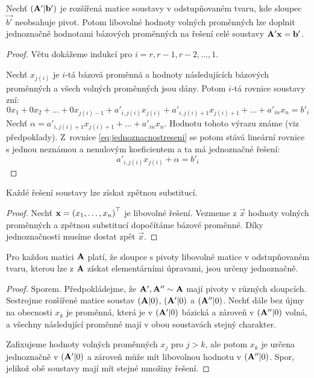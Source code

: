 \begin{theorem}
    \label{th:jednoznacnostreseni}
    Nechť $(\mathbf{A'}|\mathbf{b'})$ je rozšířená matice soustavy v odstupňovaném
    tvaru, kde sloupec $\vec{b'}$ neobsahuje pivot. Potom libovolné hodnoty
    volných proměnných lze doplnit jednoznačně hodnotami bázových proměnných
    na řešení celé soustavy $\mathbf{A'}\mathbf{x} = \mathbf{b'}$.
\end{theorem}

\begin{proof}
    Větu dokážeme indukcí pro $i=r,r-1,r-2,\dots,1$.

    Nechť $x_{j(i)}$ je $i$-tá bázová proměnná a hodnoty následujících
    bázových proměnných a všech volných proměnných jsou dány. Potom $i$-tá
    rovnice soustavy zní:
    \begin{equation}
        \label{eq:jednoznacnostreseni}
        0x_1 + 0x_2 + \dots + 0x_{j(i) -1} + a'_{i,j(i)}x_{j(i)} +
        a'_{i,j(i)+1}x_{j(i)+1} + \dots + a'_{in}x_n = b'_i
    \end{equation}
    Nechť $\alpha = a'_{i,j(i)+1}x_{j(i)+1} + \dots + a'_{in}x_n$. Hodnotu
    tohoto výrazu známe (viz předpoklady). Z~rovnice 
    \ref{eq:jednoznacnostreseni} se potom stává lineární rovnice s jednou
    neznámou a nenulovým koeficientem a ta má jednoznačné řešení:
    \begin{equation*}
        a'_{i,j(i)}x_{j(i)} + \alpha = b'_i
    \end{equation*}
\end{proof}

\begin{corollary}
    Každé řešení soustavy lze získat zpětnou substitucí.
\end{corollary}

\begin{proof}
    Nechť $\mathbf{x}=\left( x_1,\dots,x_n\right)^\top$ je libovolné řešení. Vezmeme z
    $\vec{x}$ hodnoty volných proměnných a zpětnou substitucí dopočítáme
    bázové proměnné. Díky jednoznačnosti musíme dostat zpět $\vec{x}$.
\end{proof}

\begin{theorem}
    Pro každou matici $\mathbf{A}$ platí, že sloupce s pivoty libovolné
    matice v odstupňovaném tvaru, kterou lze z $\mathbf{A}$ získat
    elementárními úpravami, jsou určeny jednoznačně.
\end{theorem}

\begin{proof}
    Sporem. Předpokládejme, že $\mathbf{A'},\mathbf{A''} \sim \mathbf{A}$ mají pivoty
    v různých sloupcích. Sestrojme rozšířené matice soustav $(\mathbf{A}|0)$,
    $(\mathbf{A'}|0)$ a $(\mathbf{A''}|0)$. Nechť dále bez újmy na obecnosti $x_k$
    je proměnná, která je v $(\mathbf{A'}|0)$ bázická a zároveň v
    $(\mathbf{A''}|0)$ volná, a všechny následující proměnné mají v obou
    soustavách stejný charakter.

    Zafixujeme hodnoty volných proměnných $x_j$ pro $j > k$, ale potom $x_k$
    je určena jednoznačně v $(\mathbf{A'}|0)$ a zároveň může mít libovolnou
    hodnotu v $(\mathbf{A''}|0)$. Spor, jelikož obě soustavy mají mít stejné
    množiny řešení.
\end{proof}

